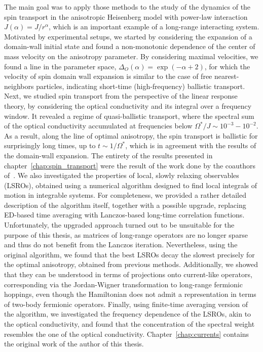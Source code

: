 The main goal was to apply those methods to the study of the dynamics of the spin transport in the anisotropic
Heisenberg model with power-law interaction \(J(\alpha) = J/r^{\alpha}\), which is an important example of a
long-range interacting system. Motivated by experimental setups, we started by considering the
expansion of a domain-wall initial state and found a non-monotonic dependence of the
center of mass velocity on the anisotropy parameter. By considering maximal velocities,
we found a line in the parameter space, \(\Delta_O(\alpha) = \exp(-\alpha + 2)\),
for which the velocity of spin domain wall expansion is similar to the case of free
nearest-neighbors particles, indicating short-time (high-frequency) ballistic transport.
Next, we studied spin transport from the perspective of the linear response theory,
by considering the optical conductivity and its integral over a frequency window.
It revealed a regime of quasi-ballistic transport, where the spectral sum
of the optical conductivity accumulated at frequencies below \(\Omega^{\ast}/J \sim
10^{-3}-10^{-2}\). As a result, along the line of optimal anisotropy, the spin
transport is ballistic for surprisingly long times, up to \(t \sim 1/\Omega^{\ast}\),
which is in agreement with the results of the domain-wall expansion. The entirety of
the results presented in chapter~\ref{chap:spin_transport} were the result of the
work done by the coauthors of~\textcite{Mierzejewski2023}.
We also investigated the properties of local, slowly relaxing observables
(LSROs), obtained using a numerical algorithm designed to find local integrals of
motion in integrable systems. For completeness, we provided a rather detailed
description of the algorithm itself, together with a possible upgrade, replacing
ED-based time averaging with Lanczos-based long-time correlation functions.
Unfortunately, the upgraded approach turned out to be unsuitable for the purpose of
this thesis, as matrices of long-range operators are no longer sparse and thus do not
benefit from the Lanczos iteration. Nevertheless, using the original algorithm, we
found that the best LSROs decay the slowest precisely for the optimal anisotropy, obtained from
previous methods. Additionally, we showed that they can be understood in terms of projections onto
current-like operators, corresponding via the Jordan-Wigner transformation to long-range fermionic hoppings,
even though the Hamiltonian does not admit a representation in terms of two-body fermionic operators.
Finally, using finite-time averaging version of the algorithm, we investigated the frequency dependence
of the LSROs, akin to the optical conductivity, and found that the concentration of the spectral weight
resembles the one of the optical conductivity. Chapter~\ref{chap:currents} contains the original work
of the author of this thesis.

